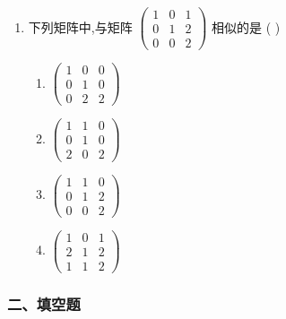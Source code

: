 \documentclass[12pt, a4paper]{ctexart}
\begin{document}
\begin{enumerate}
    \item 下列矩阵中,与矩阵 $ \begin{pmatrix}1&0&1\\0&1&2\\0&0&2\end{pmatrix} $ 相似的是 ( \underline{\hspace{1cm}} )
    \begin{enumerate}[label=(\Alph*)]
        \item $ \begin{pmatrix}1&0&0\\0&1&0\\0&2&2\end{pmatrix} $
        \item $ \begin{pmatrix}1&1&0\\0&1&0\\2&0&2\end{pmatrix} $
        \item $ \begin{pmatrix}1&1&0\\0&1&2\\0&0&2\end{pmatrix} $
        \item $ \begin{pmatrix}1&0&1\\2&1&2\\1&1&2\end{pmatrix} $
    \end{enumerate}
\end{enumerate}

\subsubsection*{二、填空题}
\end{document}
